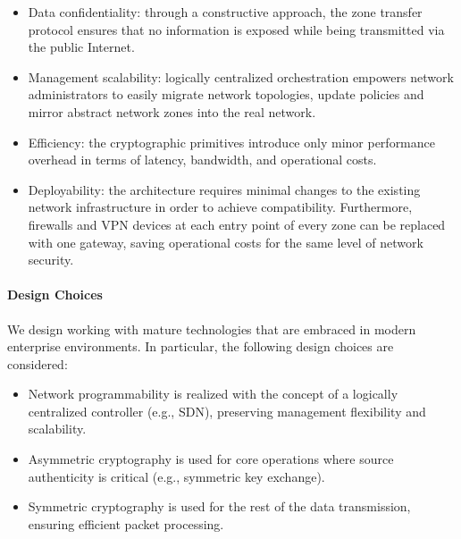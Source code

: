 \begin{itemize}
	\item Data confidentiality: through a constructive approach, the zone transfer
	      protocol ensures that no information
	      is exposed while being transmitted via the public Internet.
	\item Management scalability: logically centralized orchestration empowers
	      network administrators to easily migrate network topologies, update policies and
	      mirror abstract network zones into the real network.
	\item Efficiency: the cryptographic primitives introduce only minor performance
	      overhead in terms of latency, bandwidth, and operational costs.
	\item Deployability: the \name architecture requires minimal changes to the
	      existing network infrastructure in order to achieve compatibility. Furthermore,
	      firewalls and VPN devices
	      at each entry point of every zone can be replaced with one \name gateway, saving
	      operational costs for the same level of network security.
\end{itemize}


\paragraph{Design Choices}
We design \name working with mature technologies that are embraced in modern enterprise
environments. In particular, the following design choices are considered:

\begin{itemize}
	\item Network programmability is realized with the concept of a logically centralized
	      controller (e.g., SDN), preserving management flexibility and scalability.
	\item Asymmetric cryptography is used for core operations where source
	      authenticity is critical (e.g., symmetric key exchange).
	\item Symmetric cryptography is used for the rest of the data
	      transmission, ensuring efficient packet processing.
\end{itemize}

